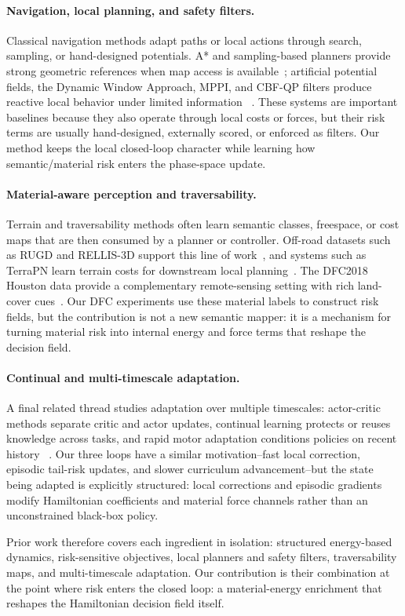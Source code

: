 \paragraph{Navigation, local planning, and safety filters.}
Classical navigation methods adapt paths or local actions through
search, sampling, or hand-designed potentials. A* and sampling-based
planners provide strong geometric references when map access is
available~\citep{hart1968formal,karaman2011sampling}; artificial
potential fields, the Dynamic Window Approach, MPPI, and CBF-QP filters
produce reactive local behavior under limited information
~\citep{khatib1986real,fox1997dynamic,williams2017mppi,ames2016control}.
These systems are important baselines because they also operate through
local costs or forces, but their risk terms are usually hand-designed,
externally scored, or enforced as filters. Our method keeps the local
closed-loop character while learning how semantic/material risk enters
the phase-space update.

\paragraph{Material-aware perception and traversability.}
Terrain and traversability methods often learn semantic classes,
freespace, or cost maps that are then consumed by a planner or
controller. Off-road datasets such as RUGD and RELLIS-3D support this
line of work~\citep{rugd2019,rellis2020}, and systems such as TerraPN
learn terrain costs for downstream local planning~\citep{sathyamoorthy2022terrapn}.
The DFC2018 Houston data provide a complementary remote-sensing setting
with rich land-cover cues~\citep{dfc2018}. Our DFC experiments use these
material labels to construct risk fields, but the contribution is not a
new semantic mapper: it is a mechanism for turning material risk into
internal energy and force terms that reshape the decision field.

\paragraph{Continual and multi-timescale adaptation.}
A final related thread studies adaptation over multiple timescales:
actor-critic methods separate critic and actor updates, continual
learning protects or reuses knowledge across tasks, and rapid motor
adaptation conditions policies on recent history
~\citep{kirkpatrick2017ewc,rusu2016progressive,kumar2021rma}.
Our three loops have a similar motivation--fast local correction,
episodic tail-risk updates, and slower curriculum advancement--but the
state being adapted is explicitly structured: local corrections and
episodic gradients modify Hamiltonian coefficients and material force
channels rather than an unconstrained black-box policy.

Prior work therefore covers each ingredient in isolation: structured
energy-based dynamics, risk-sensitive objectives, local planners and
safety filters, traversability maps, and multi-timescale adaptation. Our
contribution is their combination at the point where risk enters the
closed loop: a material-energy enrichment that reshapes the Hamiltonian
decision field itself.
